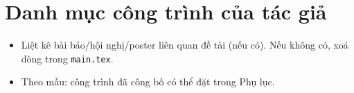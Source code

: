 \chapter*{Danh mục công trình của tác giả}

\begin{goiy}
  \begin{itemize}
    \item Liệt kê bài báo/hội nghị/poster liên quan đề tài (nếu có). Nếu không có, xoá dòng \verb|| trong \texttt{main.tex}.
    \item Theo mẫu: công trình đã công bố có thể đặt trong Phụ lục.
  \end{itemize}
\end{goiy}

